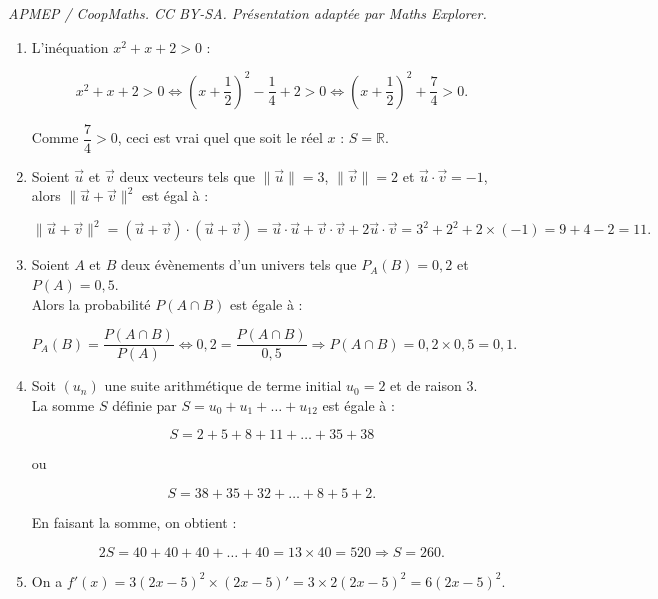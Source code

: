 \documentclass[10pt]{article}
\begin{document}
\noindent\textit{APMEP / CoopMaths. CC BY-SA. Présentation adaptée par Maths Explorer.}\par\medskip
\begin{enumerate}
		\item 	L'inéquation \(x^2 + x + 2 > 0\) :
		
		\[
		x^2 + x + 2 > 0 \iff \left( x + \dfrac{1}{2} \right)^2 - \dfrac{1}{4} + 2 > 0 \iff \left( x + \dfrac{1}{2} \right)^2 + \dfrac{7}{4} > 0.
		\]
		
		Comme \(\dfrac{7}{4} > 0\), ceci est vrai quel que soit le réel \(x\) : \(S = \mathbb{R}\).
		
		\item 
		
		Soient \(\overrightarrow{u}\) et \(\overrightarrow{v}\) deux vecteurs tels que \(\|\overrightarrow{u} \| = 3\), \(\|\overrightarrow{v} \| = 2\) et \(\overrightarrow{u} \cdot \overrightarrow{v} = -1\),\\
		alors \(\|\overrightarrow{u} + \overrightarrow{v} \|^2\) est égal à :
		
		\[
		\|\overrightarrow{u} + \overrightarrow{v} \|^2 = (\overrightarrow{u} + \overrightarrow{v}) \cdot (\overrightarrow{u} + \overrightarrow{v}) = \overrightarrow{u} \cdot \overrightarrow{u} + \overrightarrow{v} \cdot \overrightarrow{v} + 2 \overrightarrow{u} \cdot \overrightarrow{v} = 3^2 + 2^2 + 2 \times (-1) = 9 + 4 - 2 = 11.
		\]
		
		\item 
		
		Soient \(A\) et \(B\) deux évènements d'un univers tels que \(P_A(B) = 0,2\) et \(P(A) = 0,5\).\\ Alors la probabilité \(P(A \cap B)\) est égale à :
		
		\[
		P_A(B) = \dfrac{P(A \cap B)}{P(A)} \iff 0,2 = \dfrac{P(A \cap B)}{0,5} \Rightarrow P(A \cap B) = 0,2 \times 0,5 = 0,1.
		\]
		
		\item 
		
		Soit \((u_n)\) une suite arithmétique de terme initial \(u_0 = 2\) et de raison $3$.\\ 
		La somme \(S\) définie par \(S = u_0 + u_1 + \ldots + u_{12}\) est égale à :
		
		\[
		S = 2 + 5 + 8 + 11 + \ldots + 35 + 38
		\]
		
		ou
		
		\[
		S = 38 + 35 + 32 + \ldots + 8 + 5 + 2.
		\]
		
		En faisant la somme, on obtient :
		
		\[
		2S = 40 + 40 + 40 + \ldots + 40 = 13 \times 40 = 520 \Rightarrow S = 260.
		\]
		
		\item 
		
		On a \(f'(x) = 3(2x - 5)^2 \times (2x - 5)' = 3 \times 2(2x - 5)^2 = 6(2x - 5)^2\).
	\end{enumerate}
\end{document}
